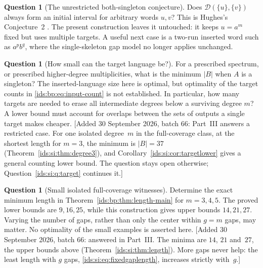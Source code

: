 \documentclass[11pt,letterpaper]{article}
\theoremstyle{definition}\newtheorem{definition}[theorem]{Definition}
\theoremstyle{remark}\newtheorem{remark}[theorem]{Remark}
\theoremstyle{definition}\newtheorem{question}[theorem]{Question}
\newcommand{\spec}[2]{\mathcal D(#1,#2)}
\begin{document}
\begin{question}[The unrestricted both-singleton conjecture]
\label{ids:bp:q:singleton}
Does $\spec{\{u\}}{\{v\}}$ always form an initial interval for arbitrary
words $u,v$? This is Hughes's Conjecture~2 \cite[Section~11]{Hughes2026}.
The present construction leaves it untouched: it keeps $u=a^m$ fixed but
uses multiple targets. A useful next case is a two-run inserted word such as
$a^pb^q$, where the single-skeleton gap model no longer applies unchanged.
\end{question}

\begin{question}[How small can the target language be?]
\label{ids:bp:q:target}
For a prescribed spectrum, or prescribed higher-degree multiplicities, what
is the minimum $|B|$ when $A$ is a singleton? The inserted-language size here
is optimal, but optimality of the target counts in
\eqref{ids:bp:eq:input-count} is not established. In particular, how many
targets are needed to erase all intermediate degrees below a surviving degree
$m$? A lower bound must account for overlaps between the sets of outputs a
single target makes cheaper.
[Added 30 September 2026, batch 66: Part~III answers a restricted case. For
one isolated degree~$m$ in the full-coverage class, at the shortest length for
$m=3$, the minimum is $|B|=37$ (Theorem~\ref{ids:si:thm:degree3}), and
Corollary~\ref{ids:si:cor:targetlower} gives a general counting lower bound.
The question stays open otherwise; Question~\ref{ids:si:q:target} continues
it.]
\end{question}

\begin{question}[Small isolated full-coverage witnesses]
\label{ids:bp:q:small}
Determine the exact minimum length in Theorem~\ref{ids:bp:thm:length-main} for
$m=3,4,5$. The proved lower bounds are $9,16,25$, while this construction
gives upper bounds $14,21,27$. Varying the number of gaps, rather than only
the center within $g=m$ gaps, may matter. No optimality of the small examples
is asserted here.
[Added 30 September 2026, batch 66: answered in Part~III. The minima are
$14$, $21$ and~$27$, the upper bounds above
(Theorem~\ref{ids:si:thm:length}). More gaps never help: the least length
with $g$ gaps, \eqref{ids:si:eq:fixedgaplength}, increases strictly
with~$g$.]
\end{question}
\end{document}
